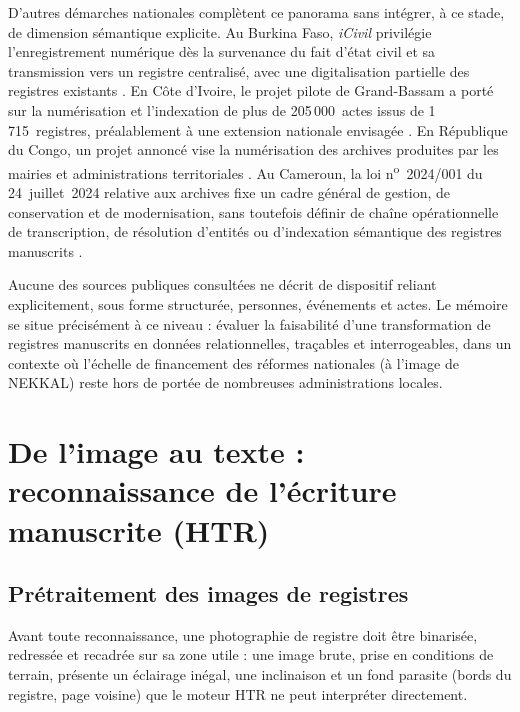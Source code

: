 D'autres démarches nationales complètent ce panorama sans intégrer, à ce stade, de dimension sémantique explicite.
Au Burkina Faso, \textit{iCivil} privilégie l'enregistrement numérique dès la survenance du fait d'état civil et sa transmission vers un registre centralisé, avec une digitalisation partielle des registres existants \cite{ogp2023burkina}.
En Côte d'Ivoire, le projet pilote de Grand-Bassam a porté sur la numérisation et l'indexation de plus de 205\,000~actes issus de 1\,715~registres, préalablement à une extension nationale envisagée \cite{aimf2024grandbassam}.
En République du Congo, un projet annoncé vise la numérisation des archives produites par les mairies et administrations territoriales \cite{quenum2024congo}.
Au Cameroun, la loi n\textsuperscript{o}~2024/001 du 24~juillet~2024 relative aux archives fixe un cadre général de gestion, de conservation et de modernisation, sans toutefois définir de chaîne opérationnelle de transcription, de résolution d'entités ou d'indexation sémantique des registres manuscrits \cite{cameroun2024loiarchives}.

Aucune des sources publiques consultées ne décrit de dispositif reliant explicitement, sous forme structurée, personnes, événements et actes.
Le mémoire se situe précisément à ce niveau : évaluer la faisabilité d'une transformation de registres manuscrits en données relationnelles, traçables et interrogeables, dans un contexte où l'échelle de financement des réformes nationales (à l'image de NEKKAL) reste hors de portée de nombreuses administrations locales.

\section{De l'image au texte : reconnaissance de l'écriture manuscrite (HTR)}
\label{sec:htr}

\subsection{Prétraitement des images de registres}
\label{sec:pretraitement}

Avant toute reconnaissance, une photographie de registre doit être binarisée, redressée et recadrée sur sa zone utile : une image brute, prise en conditions de terrain, présente un éclairage inégal, une inclinaison et un fond parasite (bords du registre, page voisine) que le moteur HTR ne peut interpréter directement.

